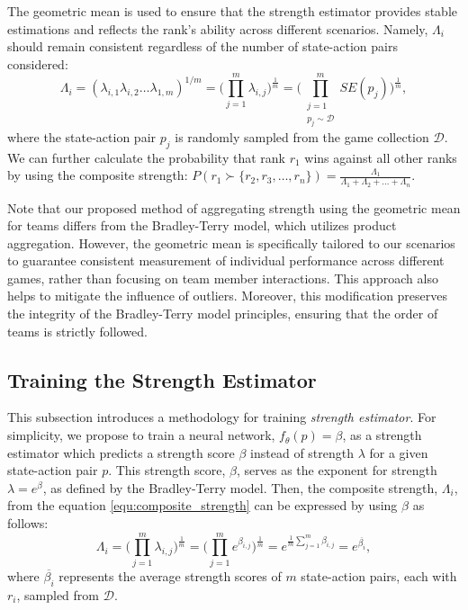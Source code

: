 The geometric mean is used to ensure that the strength estimator provides stable estimations and reflects the rank's ability across different scenarios.
Namely, $\Lambda_i$ should remain consistent regardless of the number of state-action pairs considered:
\begin{equation}
\label{equ:composite_strength}
    \Lambda_i = (\lambda_{i,1}\lambda_{i,2}\ldots\lambda_{1,m})^{1/m}
              = \biggl(\prod_{j=1}^{m} \lambda_{i,j}\biggl)^\frac{1}{m}
              = \biggl(\prod_{\substack{j=1 \\ p_j \sim \mathcal{D}}}^{m} SE(p_j)\biggl)^\frac{1}{m},
\end{equation}
where the state-action pair $p_j$ is randomly sampled from the game collection $\mathcal{D}$.
We can further calculate the probability that rank $r_1$ wins against all other ranks by using the composite strength: $P(r_1\succ\{r_2, r_3, \ldots, r_n\}) = \frac{\Lambda_1}{\Lambda_1+\Lambda_2+\ldots+\Lambda_n}$.

Note that our proposed method of aggregating strength using the geometric mean for teams differs from the Bradley-Terry model, which utilizes product aggregation.
However, the geometric mean is specifically tailored to our scenarios to guarantee consistent measurement of individual performance across different games, rather than focusing on team member interactions.
This approach also helps to mitigate the influence of outliers.
Moreover, this modification preserves the integrity of the Bradley-Terry model principles, ensuring that the order of teams is strictly followed.


\subsection{Training the Strength Estimator}
\label{subsec:method_training_strength_estimation}
This subsection introduces a methodology for training \textit{strength estimator}.
For simplicity, we propose to train a neural network, $f_\theta(p)=\beta$, as a strength estimator which predicts a strength score $\beta$ instead of strength $\lambda$ for a given state-action pair $p$.
This strength score, $\beta$, serves as the exponent for strength $\lambda=e^\beta$, as defined by the Bradley-Terry model.
Then, the composite strength, $\Lambda_{i}$, from the equation \ref{equ:composite_strength} can be expressed by using $\beta$ as follows:
\begin{equation}
\label{equ:composite_strength_beta}
    \Lambda_i = \biggl(\prod_{j=1}^{m} \lambda_{i,j}\biggl)^\frac{1}{m}
              = \biggl(\prod_{j=1}^{m} e^{\beta_{i,j}}\biggl)^\frac{1}{m}
              = e^{\frac{1}{m}\sum_{j=1}^{m} \beta_{i,j}}
              = e^{\overline{\beta_i}},
\end{equation}
where $\overline{\beta_i}$ represents the average strength scores of $m$ state-action pairs, each with $r_i$, sampled from $\mathcal{D}$.


